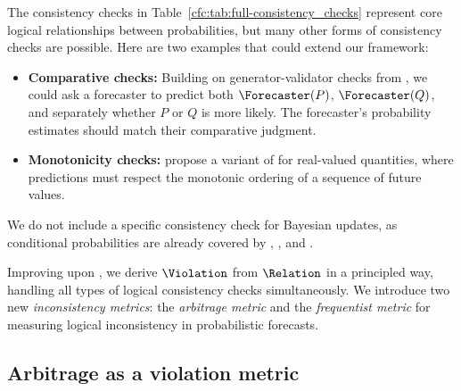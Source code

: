 The consistency checks in Table~\ref{cfc:tab:full-consistency_checks} represent core logical relationships between probabilities, but many other forms of consistency checks are possible. Here are two examples that could extend our framework:

\begin{itemize}
    \item \textbf{Comparative checks:} Building on generator-validator checks from \citet{liGeneratorValidatorConsistency2023}, we could ask a forecaster to predict both $\Forecaster(P)$, $\Forecaster(Q)$, and separately whether $P$ or $Q$ is more likely. The forecaster's probability estimates should match their comparative judgment.

    \item \textbf{Monotonicity checks:} \citet{esmwcc} propose a variant of \ConsequenceChecker{} for real-valued quantities, where predictions must respect the monotonic ordering of a sequence of future values. 
\end{itemize}

We do not include a specific consistency check for Bayesian updates, as conditional probabilities are already covered by \CondChecker{}, \CondCondChecker{}, and \ExpectedEvidenceChecker{}.

Improving upon \citep{esmwcc}, we derive $\Violation$
from $\Relation$ in a principled way,
handling all types of logical consistency checks simultaneously.
We introduce two new \emph{inconsistency metrics}: the \emph{arbitrage metric} and the \emph{frequentist metric} for measuring logical inconsistency in probabilistic forecasts.

\subsection{Arbitrage as a violation metric}
\label{cfc:sec:arbitrage}
\label{cfc:app:arbitrage}

